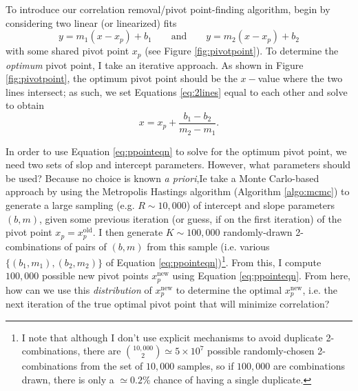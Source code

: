 To introduce our correlation removal/pivot point-finding algorithm, begin by considering two linear (or linearized) fits 
\begin{equation}
\label{eq:2lines}
    y=m_1(x-x_p)+b_1 \qquad\text{and}\qquad y=m_2(x-x_p)+b_2
\end{equation}
with some shared pivot point $x_p$ (see Figure \ref{fig:pivotpoint}). To determine the \textit{optimum} pivot point, I take an iterative approach. As shown in Figure \ref{fig:pivotpoint}, the optimum pivot point should be the $x-$value where the two lines intersect; as such, we set Equations \eqref{eq:2lines} equal to each other and solve to obtain
\begin{equation}
    \label{eq:ppointeqn}
    x=x_p+ \frac{b_1-b_2}{m_2-m_1}.
\end{equation}

In order to use Equation \eqref{eq:ppointeqn} to solve for the optimum pivot point, we need two sets of slop and intercept parameters. However, what parameters should be used? Because no choice is known \textit{a priori},Ie take a Monte Carlo-based approach by using the Metropolis Hastings algorithm (Algorithm \ref{algo:mcmc}) to generate a large sampling (e.g. $R\sim 10,000$) of intercept and slope parameters $(b,m)$, given some previous iteration (or guess, if on the first iteration) of the pivot point $x_p=x_p^\text{old}$. I then generate $K\sim 100,000$ randomly-drawn 2-combinations of pairs of $(b,m)$ from this sample (i.e. various $\{(b_1,m_1),(b_2,m_2)\}$ of Equation \eqref{eq:ppointeqn})\footnote{I note that although I don't use explicit mechanisms to avoid duplicate 2-combinations, there are $\binom{10,000}{2} \simeq 5\times 10^7$ possible randomly-chosen 2-combinations from the set of $10,000$ samples, so if $100,000$ are combinations drawn, there is only a $\simeq 0.2\%$ chance of having a single duplicate.}. From this, I compute $100,000$ possible new pivot points $x_p^\text{new}$ using Equation \eqref{eq:ppointeqn}. From here, how can we use this \textit{distribution} of $x_p^\text{new}$ to determine the optimal $x_p^\text{new}$, i.e. the next iteration of the true optimal pivot point that will minimize correlation?

